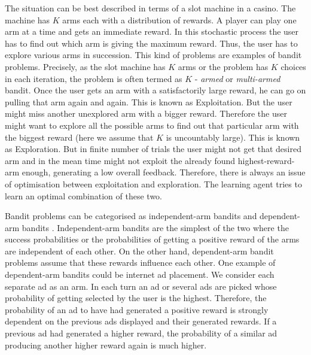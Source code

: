 \documentclass[english]{tktltiki}
\begin{document}
The situation can be best described in terms of a slot machine in a casino. The machine has $K$ arms each with a distribution of rewards. A player can play one arm at a time and gets an immediate reward. In this stochastic process the user has to find out which arm is giving the maximum reward. Thus, the user has to explore various arms in succession. This kind of problems are examples of bandit problems. Precisely, as the slot machine has $K$ arms or the problem has $K$ choices in each iteration, the problem is often termed as $K$ - \textit{armed} or \textit{multi-armed} bandit. Once the user gets an arm with a satisfactorily large reward, he can go on pulling that arm again and again. This is known as Exploitation. But the user might miss another unexplored arm with a bigger reward. Therefore the user might want to explore all the possible arms to find out that particular arm with the biggest reward (here we assume that $K$ is uncountably large). This is known as Exploration. But in finite number of trials the user might not get that desired arm and in the mean time might not exploit the already found highest-reward-arm enough, generating a low overall feedback. Therefore, there is always an issue of optimisation between exploitation and exploration. The learning agent tries to learn an optimal combination of these two.

Bandit problems can be categorised as independent-arm bandits \cite{independent_arm_bandits_1, independent_arm_bandits_2} and dependent-arm bandits \cite{dependent_arm_bandits}. Independent-arm bandits are the simplest of the two where the success probabilities or the probabilities of getting a positive reward of the arms are independent of each other. On the other hand, dependent-arm bandit problems assume that these rewards influence each other. One example of dependent-arm bandits could be internet ad placement. We consider each separate ad as an arm. In each turn an ad or several ads are picked whose probability of getting selected by the user is the highest. Therefore, the probability of an ad to have had generated a positive reward is strongly dependent on the previous ads displayed and their generated rewards. If a previous ad had generated a higher reward, the probability of a similar ad producing another higher reward again is much higher.

\end{document}
